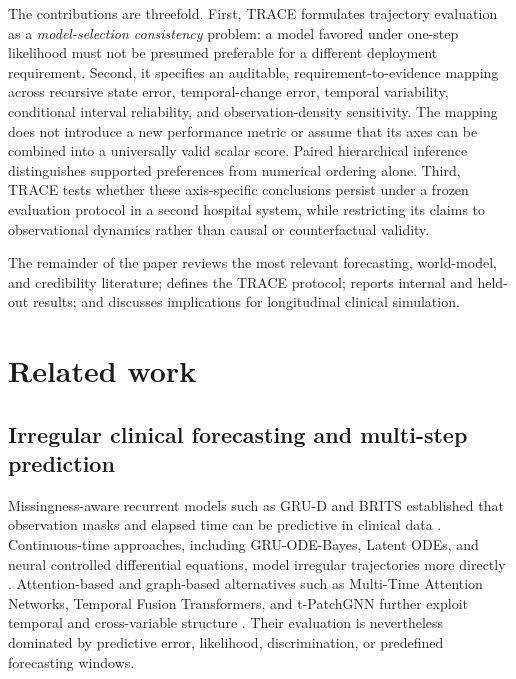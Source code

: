 \documentclass[preprint,12pt]{elsarticle}
\begin{document}
The contributions are threefold. First, TRACE formulates trajectory evaluation as a \emph{model-selection consistency} problem: a model favored under one-step likelihood must not be presumed preferable for a different deployment requirement. Second, it specifies an auditable, requirement-to-evidence mapping across recursive state error, temporal-change error, temporal variability, conditional interval reliability, and observation-density sensitivity. The mapping does not introduce a new performance metric or assume that its axes can be combined into a universally valid scalar score. Paired hierarchical inference distinguishes supported preferences from numerical ordering alone. Third, TRACE tests whether these axis-specific conclusions persist under a frozen evaluation protocol in a second hospital system, while restricting its claims to observational dynamics rather than causal or counterfactual validity.

The remainder of the paper reviews the most relevant forecasting, world-model, and credibility literature; defines the TRACE protocol; reports internal and held-out results; and discusses implications for longitudinal clinical simulation.

\section{Related work}
\label{sec:related}

\subsection{Irregular clinical forecasting and multi-step prediction}

Missingness-aware recurrent models such as GRU-D and BRITS established that observation masks and elapsed time can be predictive in clinical data \cite{che2018grud,cao2018brits}. Continuous-time approaches, including GRU-ODE-Bayes, Latent ODEs, and neural controlled differential equations, model irregular trajectories more directly \cite{debrouwer2019gruodebayes,rubanova2019latentode,kidger2020neuralcde}. Attention-based and graph-based alternatives such as Multi-Time Attention Networks, Temporal Fusion Transformers, and t-PatchGNN further exploit temporal and cross-variable structure \cite{shukla2021mtan,lim2021tft,zhang2024tpatchgnn}. Their evaluation is nevertheless dominated by predictive error, likelihood, discrimination, or predefined forecasting windows.
\end{document}

